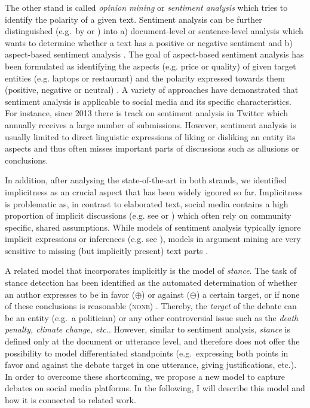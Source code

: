 \documentclass[11pt]{article}
\begin{document}
The other stand is called \textit{opinion mining} or \textit{sentiment analysis} which tries to identify the polarity of a given text.
Sentiment analysis can be further distinguished (e.g.\ by  or ) into a) document-level or sentence-level analysis which wants to determine whether a text has a positive or negative sentiment \cite{pang2002thumbs,turney2002thumbs,yu2003towards} and b) aspect-based sentiment analysis \cite{hu2004mining}.
The goal of aspect-based sentiment analysis has been formulated as identifying the aspects (e.g. price or quality) of given target entities (e.g. laptops or restaurant) and the polarity expressed towards them (positive, negative or neutral) \cite{pontiki2014semeval,pontiki2015semeval,pontiki2016semeval}.
A variety of approaches have demonstrated that sentiment analysis is applicable to social media and its specific characteristics. For instance, since 2013 there is track on sentiment analysis in Twitter which annually receives a large number of submissions.
However, sentiment analysis is usually limited to direct linguistic expressions of liking or disliking an entity its aspects \cite{pontiki2014semeval,pontiki2015semeval,pontiki2016semeval} and thus often misses important parts of discussions such as allusions or conclusions.

In addition, after analysing the state-of-the-art in both strands, we identified implicitness as an crucial aspect that has been widely ignored so far.
Implicitness is problematic as, in contrast to elaborated text, social media contains a high proportion of implicit discussions (e.g. see  or ) which often rely on community specific, shared assumptions.
While models of sentiment analysis typically ignore implicit expressions or inferences (e.g. see \cite{pontiki2014semeval,pontiki2015semeval,pontiki2016semeval}), models in argument mining are very sensitive to missing (but implicitly present) text parts \cite{habernal2014argumentation}. 

A related model that incorporates implicitly is the model of \textit{stance}. 
The task of stance detection has been identified as the automated determination of whether an author expresses to be in favor ($\oplus$) or against ($\ominus$) a certain target, or if none of these conclusions is reasonable (\textsc{none}) \cite{StanceSemEval2016}.
Thereby, the \textit{target} of the debate can be an entity (e.g.\ a politician) or any other controversial issue such as the \textit{death penalty, climate change, etc.}.
However, similar to sentiment analysis, \textit{stance} is defined only at the document or utterance level, and therefore does not offer the possibility to model differentiated standpoints (e.g.\ expressing both points in favor and against the debate target in one utterance, giving justifications, etc.).
In order to overcome these shortcoming, we propose a new model to capture debates on social media platforms.
In the following, I will describe this model and how it is connected to related work.
\end{document}
